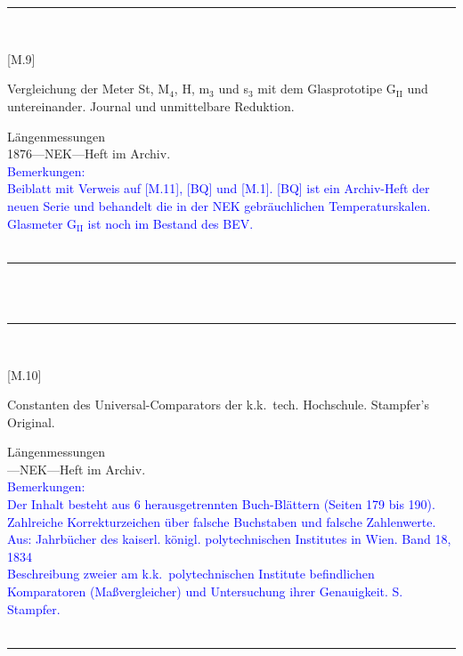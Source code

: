 \\
\vspace*{-2.5pt}\\
\parbox{\textwidth}{%
\rule{\textwidth}{1pt}\vspace*{-3mm}\\
\begin{minipage}[t]{0.2\textwidth}\vspace{0pt}
\Huge\rule[-4mm]{0cm}{1cm}[M.9]
\end{minipage}
\hfill
\begin{minipage}[t]{0.8\textwidth}\vspace{0pt}
\large Vergleichung der Meter St, M$_\mathrm{4}$, H, m$_\mathrm{3}$ und s$_\mathrm{3}$ mit dem Glasprototipe G$_\mathrm{II}$ und untereinander. Journal und unmittelbare Reduktion.\rule[-2mm]{0mm}{2mm}
\end{minipage}
{\footnotesize\flushright
Längenmessungen\\
}
1876\quad---\quad NEK\quad---\quad Heft im Archiv.\\
\textcolor{blue}{Bemerkungen:\\{}
Beiblatt mit Verweis auf [M.11], [BQ] und [M.1]. [BQ] ist ein Archiv-Heft der neuen Serie und behandelt die in der NEK gebräuchlichen Temperaturskalen.\\{}
Glasmeter G$_\mathrm{II}$ ist noch im Bestand des BEV.\\{}
}
\\[-15pt]
\rule{\textwidth}{1pt}
}
\\
\vspace*{-2.5pt}\\
\parbox{\textwidth}{%
\rule{\textwidth}{1pt}\vspace*{-3mm}\\
\begin{minipage}[t]{0.22\textwidth}\vspace{0pt}
\Huge\rule[-4mm]{0cm}{1cm}[M.10]
\end{minipage}
\hfill
\begin{minipage}[t]{0.78\textwidth}\vspace{0pt}
\large Constanten des Universal-Comparators der k.k.\ tech. Hochschule. Stampfer's Original.\rule[-2mm]{0mm}{2mm}
\end{minipage}
{\footnotesize\flushright
Längenmessungen\\
}
\quad---\quad NEK\quad---\quad Heft im Archiv.\\
\textcolor{blue}{Bemerkungen:\\{}
Der Inhalt besteht aus 6 herausgetrennten Buch-Blättern (Seiten 179 bis 190). Zahlreiche Korrekturzeichen über falsche Buchstaben und falsche Zahlenwerte.\\{}
Aus: {\glqq}Jahrbücher des kaiserl. königl. polytechnischen Institutes in Wien. Band 18, 1834{\grqq}\\{}
Beschreibung zweier am k.k.\ polytechnischen Institute befindlichen Komparatoren (Maßvergleicher) und Untersuchung ihrer Genauigkeit. S. Stampfer.\\{}
}
\\[-15pt]
\rule{\textwidth}{1pt}
}
